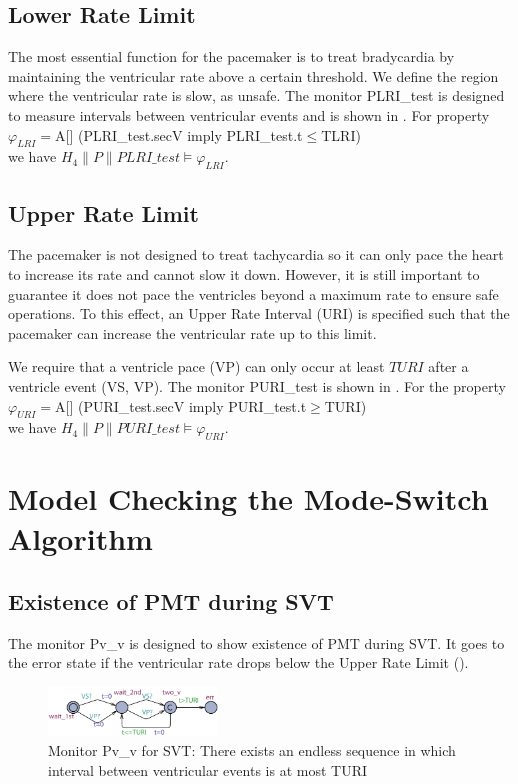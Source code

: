 \subsection{Lower Rate Limit}
The most essential function for the pacemaker is to treat bradycardia by maintaining the ventricular rate above a certain threshold. We define the region where the ventricular rate is slow, as \textsf{unsafe}. The monitor \textsf{PLRI\_test} is designed to measure intervals between ventricular events and is shown in . For property \\
\textsf{$\varphi_{LRI}=$A[] (PLRI\_test.secV imply PLRI\_test.t$\leq$TLRI)}\\ we have $H_4\| P\| PLRI\_test\models\varphi_{LRI}$.

\subsection{Upper Rate Limit}
The pacemaker is not designed to treat tachycardia so it can only pace the heart to increase its rate and cannot slow it down. However, it is still important to guarantee it does not pace the ventricles beyond a maximum rate to ensure safe operations. To this effect, an Upper Rate Interval (URI) is specified such that the pacemaker can increase the ventricular rate up to this limit. 
  
We require that a ventricle pace (VP) can only occur at least $TURI$ after a ventricle event (VS, VP). The monitor \textsf{PURI\_test} is shown in . For the property\\
$\varphi_{URI}=$\textsf{A[] (PURI\_test.secV imply PURI\_test.t$\geq$TURI)} \\
we have $H_4\| P\| PURI\_test\models \varphi_{URI}$.

\section{Model Checking the Mode-Switch Algorithm}

\subsection{Existence of PMT during SVT}
The monitor \textsf{Pv\_v} is designed to show existence of PMT during SVT. It goes to the error state if the ventricular rate drops below the Upper Rate Limit ().  
\begin{figure}
		\centering
		\includegraphics[width=0.4\textwidth]{figs/vv.pdf}
		\caption{\small Monitor \textsf{Pv\_v} for SVT: There exists an endless sequence in which interval between ventricular events is at most TURI}
		\label{fig:vv}
\end{figure}


